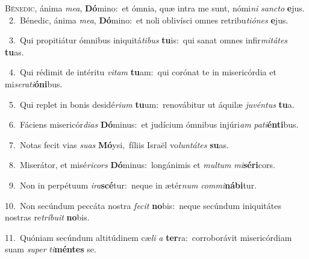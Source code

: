 \lettrine{\initial\textcolor{\initialcolor}{B}}{énedic,} ánima \textit{me}\-\textit{a}, \textbf{Dó}\-mino:~\star et ómnia, quæ intra me sunt, nómi\textit{ni} \textit{sanc}\-\textit{to} \textbf{e}\-jus.\\
{\numbfont\textcolor{\numbcolor}{~2.}}~Bénedic, ánima \textit{me}\-\textit{a}, \textbf{Dó}\-mino:~\star et noli oblivísci omnes retribu\-\textit{ti}\-\textit{ó}\textit{nes} \textbf{e}\-jus.\par
{\numbfont\textcolor{\numbcolor}{~3.}}~Qui propitiátur ómnibus iniquitá\-\textit{ti}\-\textit{bus} \textbf{tu}\-is:~\star qui sanat omnes infir\-\textit{mi}\-\textit{tá}\textit{tes} \textbf{tu}\-as.\par
{\numbfont\textcolor{\numbcolor}{~4.}}~Qui rédimit de intéritu \textit{vi}\-\textit{tam} \textbf{tu}\-am:~\star qui corónat te in misericórdia et mi\-\textit{se}\-\textit{ra}\textit{ti}\textbf{ó}\textbf{ni}bus.\par
{\numbfont\textcolor{\numbcolor}{~5.}}~Qui replet in bonis desidé\-\textit{ri}\-\textit{um} \textbf{tu}\-um:~\star renovábitur ut áquilæ \textit{ju}\-\textit{vén}\textit{tus} \textbf{tu}\-a.\par
{\numbfont\textcolor{\numbcolor}{~6.}}~Fáciens misericór\-\textit{di}\-\textit{as} \textbf{Dó}\-minus:~\star et judícium ómnibus injúri\textit{am} \textit{pa}\-\textit{ti}\textbf{én}\textbf{ti}bus.\par
{\numbfont\textcolor{\numbcolor}{~7.}}~Notas fecit vias \textit{su}\-\textit{as} \textbf{Mó}\-ysi,~\star fíliis Israël vo\-\textit{lun}\-\textit{tá}\textit{tes} \textbf{su}\-as.\par
{\numbfont\textcolor{\numbcolor}{~8.}}~Miserátor, et misé\-\textit{ri}\-\textit{cors} \textbf{Dó}\-minus:~\star longánimis et \textit{mul}\-\textit{tum} \textit{mi}\-\textbf{sé}\textbf{ri}cors.\par
{\numbfont\textcolor{\numbcolor}{~9.}}~Non in perpétuum \textit{i}\-\textit{ra}\textbf{scé}tur:~\star neque in ætér\textit{num} \textit{com}\-\textit{mi}\textbf{ná}\textbf{bi}tur.\par
{\numbfont\textcolor{\numbcolor}{10.}}~Non secúndum peccáta nostra \textit{fe}\-\textit{cit} \textbf{no}\-bis:~\star neque secúndum iniquitátes nostras re\-\textit{trí}\-\textit{bu}\textit{it} \textbf{no}\-bis.\par
{\numbfont\textcolor{\numbcolor}{11.}}~Quóniam secúndum altitúdinem cæ\textit{li} \textit{a} \textbf{ter}\-ra:~\star corroborávit misericórdiam suam \textit{su}\-\textit{per} \textit{ti}\-\textbf{mén}\textbf{tes} se.\par
